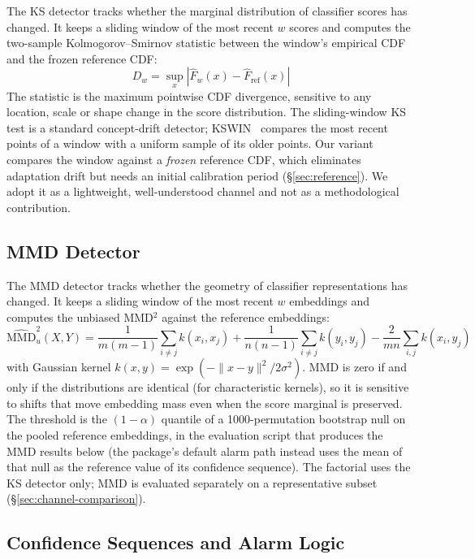 \documentclass{article}
\begin{document}
The KS detector tracks whether the marginal distribution of classifier scores has changed. It keeps a sliding window of the most recent $w$ scores and computes the two-sample Kolmogorov--Smirnov statistic between the window's empirical CDF and the frozen reference CDF:
\begin{equation}
D_w = \sup_x |\hat{F}_w(x) - \hat{F}_{\text{ref}}(x)|
\end{equation}
The statistic is the maximum pointwise CDF divergence, sensitive to any location, scale or shape change in the score distribution. The sliding-window KS test is a standard concept-drift detector; KSWIN~\citep{raab2020reactive} compares the most recent points of a window with a uniform sample of its older points. Our variant compares the window against a \emph{frozen} reference CDF, which eliminates adaptation drift but needs an initial calibration period (\S\ref{sec:reference}). We adopt it as a lightweight, well-understood channel and not as a methodological contribution.

\subsection{MMD Detector}
\label{sec:mmd}

The MMD detector tracks whether the geometry of classifier representations has changed. It keeps a sliding window of the most recent $w$ embeddings and computes the unbiased MMD$^2$ against the reference embeddings:
\begin{equation}
\widehat{\text{MMD}}^2_u(X, Y) = \frac{1}{m(m-1)} \sum_{i \neq j} k(x_i, x_j) + \frac{1}{n(n-1)} \sum_{i \neq j} k(y_i, y_j) - \frac{2}{mn} \sum_{i,j} k(x_i, y_j)
\end{equation}
with Gaussian kernel $k(x, y) = \exp(-\|x - y\|^2 / 2\sigma^2)$. MMD is zero if and only if the distributions are identical (for characteristic kernels), so it is sensitive to shifts that move embedding mass even when the score marginal is preserved. The threshold is the $(1{-}\alpha)$ quantile of a 1000-permutation bootstrap null on the pooled reference embeddings, in the evaluation script that produces the MMD results below (the package's default alarm path instead uses the mean of that null as the reference value of its confidence sequence). The factorial uses the KS detector only; MMD is evaluated separately on a representative subset (\S\ref{sec:channel-comparison}).

\subsection{Confidence Sequences and Alarm Logic}
\label{sec:cs}
\end{document}
